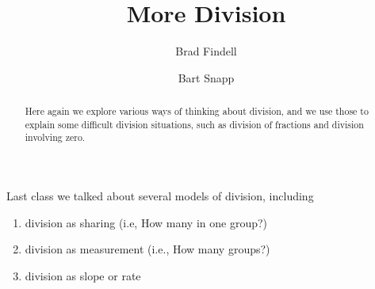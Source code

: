 \documentclass{ximera}
\author{Brad Findell \and Bart Snapp}
\title{More Division}
\begin{document}
\begin{abstract}
Here again we explore various ways of thinking about division, and we use those to explain some difficult division situations, such as division of fractions and division involving zero.
\end{abstract}
\maketitle


%
%
%


Last class we talked about several models of division, including 
\begin{enumerate}
\item division as sharing (i.e, How many in one group?)
\item division as measurement (i.e., How many groups?)
\item division as slope or rate
\end{enumerate}
\end{document}
